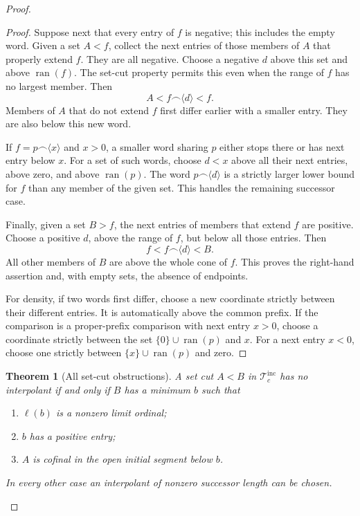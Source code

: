 \documentclass[11pt]{article}
\newtheorem{theorem}{Theorem}[section]
\theoremstyle{definition}
\theoremstyle{remark}
\newcommand{\WordsInc}{\mathcal T^{\mathrm{inc}}}
\begin{document}
\begin{proof}
\begin{proof}
Suppose next that every entry of \(f\) is negative; this includes
the empty word.  Given a set \(A<f\), collect the next entries of
those members of \(A\) that properly extend \(f\).  They are all
negative.  Choose a negative \(d\) above this set and above
\(\operatorname{ran}(f)\).  The set-cut property permits this even
when the range of \(f\) has no largest member.  Then
\[
              A<f\mathbin{\frown}\langle d\rangle<f.
\]
Members of \(A\) that do not extend \(f\) first differ earlier
with a smaller entry.  They are also below this new word.

If \(f=p\mathbin{\frown}\langle x\rangle\) and \(x>0\), a smaller
word sharing \(p\) either stops there or has next entry below \(x\).
For a set of such words, choose \(d<x\) above all their next entries,
above zero, and above \(\operatorname{ran}(p)\).
The word \(p\mathbin{\frown}\langle d\rangle\) is a strictly larger
lower bound for \(f\) than any member of the given set.
This handles the remaining successor case.

Finally, given a set \(B>f\), the next entries of members that extend
\(f\) are positive.  Choose a positive \(d\), above the range of
\(f\), but below all those entries.  Then
\[
                    f<f\mathbin{\frown}\langle d\rangle<B.
\]
All other members of \(B\) are above the whole cone of \(f\).
This proves the right-hand assertion and, with empty sets, the
absence of endpoints.

For density, if two words first differ, choose a new coordinate
strictly between their different entries.  It is automatically
above the common prefix.  If the comparison is a proper-prefix
comparison with next entry \(x>0\), choose a coordinate strictly
between the set \(\{0\}\cup\operatorname{ran}(p)\) and \(x\).
For a next entry \(x<0\), choose one strictly between
\(\{x\}\cup\operatorname{ran}(p)\) and zero.
\end{proof}

\begin{theorem}[All set-cut obstructions]
\label{swo:sh:wv:inc-cuts}
A set cut \(A<B\) in \(\WordsInc_c\) has no
interpolant if and only if \(B\) has a minimum \(b\) such that
\begin{enumerate}
\item \(\ell(b)\) is a nonzero limit ordinal;
\item \(b\) has a positive entry;
\item \(A\) is cofinal in the open initial segment below \(b\).
\end{enumerate}
In every other case an interpolant of nonzero successor length
can be chosen.
\end{theorem}


\end{proof}
\end{document}
